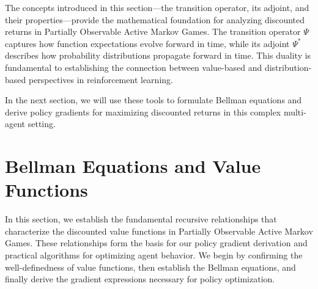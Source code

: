 The concepts introduced in this section—the transition operator, its adjoint, and
their properties—provide the mathematical foundation for analyzing discounted returns
in Partially Observable Active Markov Games. The transition operator $\Psi$
captures how function expectations evolve forward in time, while its adjoint $\Psi
    ^{*}$ describes how probability distributions propagate forward in time. This
duality is fundamental to establishing the connection between value-based and
distribution-based perspectives in reinforcement learning.

In the next section, we will use these tools to formulate Bellman equations and derive
policy gradients for maximizing discounted returns in this complex multi-agent setting.
\section{Bellman Equations and Value Functions}
In this section, we establish the fundamental recursive relationships that characterize
the discounted value functions in Partially Observable Active Markov Games.
These relationships form the basis for our policy gradient derivation and
practical algorithms for optimizing agent behavior. We begin by confirming the well-definedness
of value functions, then establish the Bellman equations, and finally derive the
gradient expressions necessary for policy optimization.
